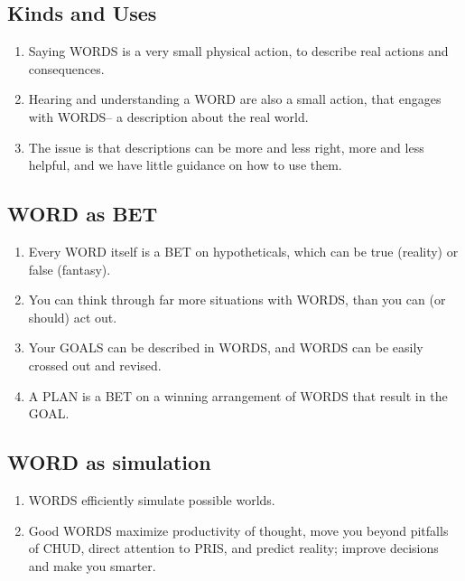 \documentclass[
]{book}
\providecommand{\tightlist}{%
  \setlength{\itemsep}{0pt}\setlength{\parskip}{0pt}}
\begin{document}
\hypertarget{kinds-and-uses}{%
\subsection{Kinds and Uses}\label{kinds-and-uses}}

\begin{enumerate}
\def\labelenumi{\arabic{enumi}.}
\setcounter{enumi}{16}
\tightlist
\item
  Saying WORDS is a very small physical action, to describe real actions
  and consequences.
\item
  Hearing and understanding a WORD are also a small action, that
  engages with WORDS-- a description about the real world.
\item
  The issue is that descriptions can be more and less right, more and less
  helpful, and we have little guidance on how to use them.
\end{enumerate}

\hypertarget{word-as-bet}{%
\subsection{WORD as BET}\label{word-as-bet}}

\begin{enumerate}
\def\labelenumi{\arabic{enumi}.}
\setcounter{enumi}{19}
\tightlist
\item
  Every WORD itself is a BET on hypotheticals, which can be true (reality) or false (fantasy).
\item
  You can think through far more situations with WORDS, than you can
  (or should) act out.
\item
  Your GOALS can be described in WORDS, and WORDS can be easily
  crossed out and revised.
\item
  A PLAN is a BET on a winning arrangement of WORDS that result in the
  GOAL.
\end{enumerate}

\hypertarget{word-as-simulation}{%
\subsection{WORD as simulation}\label{word-as-simulation}}

\begin{enumerate}
\def\labelenumi{\arabic{enumi}.}
\setcounter{enumi}{23}
\tightlist
\item
  WORDS efficiently simulate possible worlds.
\item
  Good WORDS maximize productivity of thought, move you beyond
  pitfalls of CHUD, direct attention to PRIS, and predict reality; improve
  decisions and make you smarter.
\end{enumerate}
\end{document}
